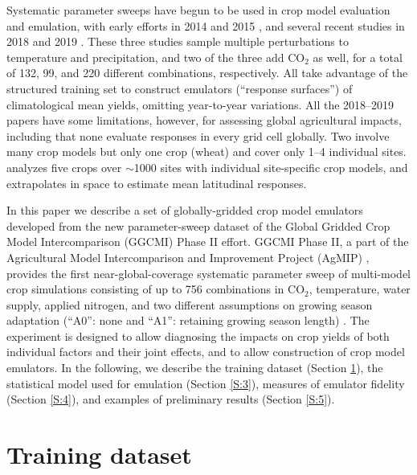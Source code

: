 \documentclass[gmd, manuscript]{copernicus} %
\begin{document}
Systematic parameter sweeps have begun to be used in crop model evaluation and emulation, with early efforts in 2014 and 2015 \citep{ruane2014, Markowski2015, Pirttioja2015}, and several recent studies in 2018 and 2019 \citep{FRONZEK20182, RUIZRAMOS2018,Snyder2018}. 
These three studies sample multiple perturbations to temperature and precipitation, and two of the three add CO$_2$ as well, for a total of 132, 99, and 220 different combinations, respectively. 
All take advantage of the structured training set to construct emulators (``response surfaces'') of climatological mean yields, omitting year-to-year variations. 
All the 2018--2019 papers have some limitations, however, for assessing global agricultural impacts, including that
none evaluate responses in every grid cell globally.
Two involve many crop models but only one crop (wheat) \citep{FRONZEK20182,RUIZRAMOS2018} and cover only 1--4 individual sites. 
\citet{Snyder2018} analyzes five crops over $\sim$1000 sites with individual site-specific crop models, and extrapolates in space to estimate mean latitudinal responses.

In this paper we describe a set of globally-gridded crop model emulators developed from the new parameter-sweep dataset of the Global Gridded Crop Model Intercomparison (GGCMI) Phase II effort. 
GGCMI Phase II, a part of the Agricultural Model Intercomparison and Improvement Project (AgMIP) \citep{ROSENZWEIG2013, Rosenzweig2014}, provides the first near-global-coverage systematic parameter sweep of multi-model crop simulations consisting of up to 756 combinations in CO$_2$, temperature, water supply, applied nitrogen, and two different assumptions on growing season adaptation (``A0'': none and ``A1'': retaining growing season length) \citep[CTWN-A,][]{franke2019ctwnexperiment,minoli2019adaptation}.
The experiment is designed to allow diagnosing the impacts on crop yields of both individual factors and their joint effects, and to allow construction of crop model emulators.
In the following, we describe the training dataset (Section \ref{S:2}), the statistical model used for emulation (Section \ref{S:3}), measures of emulator fidelity (Section \ref{S:4}), and examples of preliminary results (Section \ref{S:5}). 

\section{Training dataset}
\label{S:2}
\end{document}
